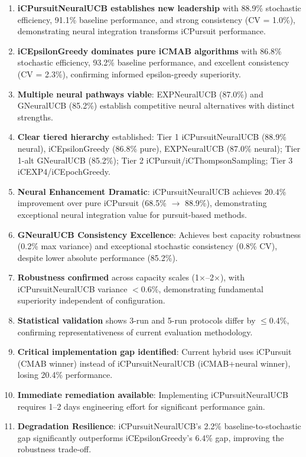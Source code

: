 \documentclass[12pt,a4paper]{article}
\newcommand{\primarytext}[1]{\textcolor{primaryblue}{\textbf{#1}}}
\newcommand{\secondarytext}[1]{\textcolor{secondaryblue}{\textbf{#1}}}
\newcommand{\success}[1]{\textcolor{accentgreen}{\textbf{#1}}}
\newcommand{\warning}[1]{\textcolor{warningred}{\textbf{#1}}}
\newcommand{\neural}[1]{\textcolor{neuralcolor}{\textbf{#1}}}
\begin{document}
\begin{enumerate}
\item \neural{iCPursuitNeuralUCB establishes new leadership} with 88.9\% stochastic efficiency, 91.1\% baseline performance, and strong consistency (CV = 1.0\%), demonstrating neural integration transforms iCPursuit performance.
\item \primarytext{iCEpsilonGreedy dominates pure iCMAB algorithms} with 86.8\% stochastic efficiency, 93.2\% baseline performance, and excellent consistency (CV = 2.3\%), confirming informed epsilon-greedy superiority.
\item \neural{Multiple neural pathways viable}: EXPNeuralUCB (87.0\%) and GNeuralUCB (85.2\%) establish competitive neural alternatives with distinct strengths.
\item \secondarytext{Clear tiered hierarchy} established: Tier 1 iCPursuitNeuralUCB (88.9\% neural), iCEpsilonGreedy (86.8\% pure), EXPNeuralUCB (87.0\% neural); Tier 1-alt GNeuralUCB (85.2\%); Tier 2 iCPursuit/iCThompsonSampling; Tier 3 iCEXP4/iCEpochGreedy.
\item \success{Neural Enhancement Dramatic}: iCPursuitNeuralUCB achieves 20.4\% improvement over pure iCPursuit (68.5\% $\rightarrow$ 88.9\%), demonstrating exceptional neural integration value for pursuit-based methods.
\item \neural{GNeuralUCB Consistency Excellence}: Achieves best capacity robustness (0.2\% max variance) and exceptional stochastic consistency (0.8\% CV), despite lower absolute performance (85.2\%).
\item \success{Robustness confirmed} across capacity scales (1$\times$--2$\times$), with iCPursuitNeuralUCB variance $<$0.6\%, demonstrating fundamental superiority independent of configuration.
\item \success{Statistical validation} shows 3-run and 5-run protocols differ by $\leq$0.4\%, confirming representativeness of current evaluation methodology.
\item \warning{Critical implementation gap identified}: Current hybrid uses iCPursuit (CMAB winner) instead of iCPursuitNeuralUCB (iCMAB+neural winner), losing 20.4\% performance.
\item \success{Immediate remediation available}: Implementing iCPursuitNeuralUCB requires 1--2 days engineering effort for significant performance gain.
\item \success{Degradation Resilience}: iCPursuitNeuralUCB's 2.2\% baseline-to-stochastic gap significantly outperforms iCEpsilonGreedy's 6.4\% gap, improving the robustness trade-off.
\end{enumerate}
\end{document}
